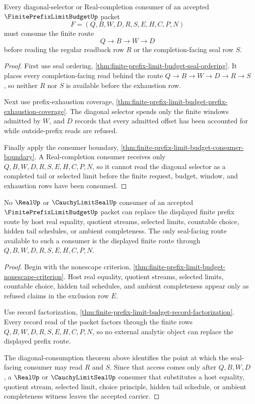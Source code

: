 \begin{theorem}
\label{thm:finite-prefix-limit-budget-diagonal-selector-consumption}
Every diagonal-selector or Real-completion consumer of an accepted $\FinitePrefixLimitBudgetUp$ packet
$$
F=(Q,B,W,D,R,S,E,H,C,P,N)
$$
must consume the finite route
$$
Q \to B \to W \to D
$$
before reading the regular readback row $R$ or the completion-facing seal row $S$.
\end{theorem}
\begin{proof}
First use seal ordering, \autoref{thm:finite-prefix-limit-budget-seal-ordering}. It places every completion-facing read behind the route $Q \to B \to W \to D \to R \to S$, so neither $R$ nor $S$ is available before the exhaustion row.

Next use prefix-exhaustion coverage, \autoref{thm:finite-prefix-limit-budget-prefix-exhaustion-coverage}. The diagonal selector spends only the finite windows admitted by $W$, and $D$ records that every admitted offset has been accounted for while outside-prefix reads are refused.

Finally apply the consumer boundary, \autoref{thm:finite-prefix-limit-budget-consumer-boundary}. A Real-completion consumer receives only $Q,B,W,D,R,S,E,H,C,P,N$, so it cannot read the diagonal selector as a completed tail or selected limit before the finite request, budget, window, and exhaustion rows have been consumed.
\end{proof}

\begin{theorem}
\label{thm:finite-prefix-limit-budget-real-seal-nonescape-extension}
No $\RealUp$ or $\CauchyLimitSealUp$ consumer of an accepted $\FinitePrefixLimitBudgetUp$ packet can replace the displayed finite prefix route by host real equality, quotient streams, selected limits, countable choice, hidden tail schedules, or ambient completeness. The only seal-facing route available to such a consumer is the displayed finite route through $Q,B,W,D,R,S,E,H,C,P,N$.
\end{theorem}
\begin{proof}
Begin with the nonescape criterion, \autoref{thm:finite-prefix-limit-budget-nonescape-criterion}. Host real equality, quotient streams, selected limits, countable choice, hidden tail schedules, and ambient completeness appear only as refused claims in the exclusion row $E$.

Use record factorization, \autoref{thm:finite-prefix-limit-budget-record-factorization}. Every record read of the packet factors through the finite rows $Q,B,W,D,R,S,E,H,C,P,N$, so no external analytic object can replace the displayed prefix route.

The diagonal-consumption theorem above identifies the point at which the seal-facing consumer may read $R$ and $S$. Since that access comes only after $Q,B,W,D$, a $\RealUp$ or $\CauchyLimitSealUp$ consumer that substitutes a host equality, quotient stream, selected limit, choice principle, hidden tail schedule, or ambient completeness witness leaves the accepted carrier.
\end{proof}

